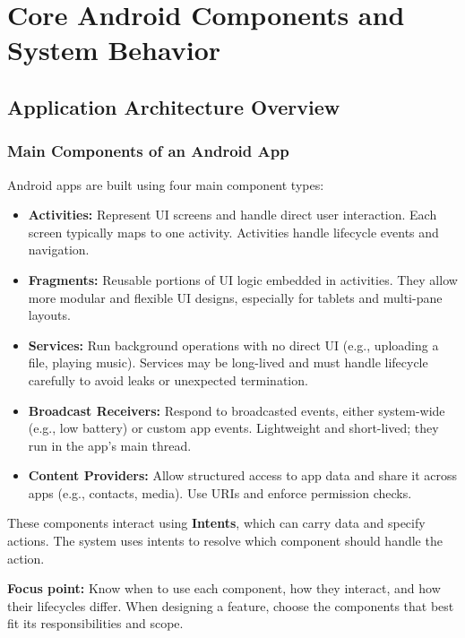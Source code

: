 \documentclass[a4paper,12pt]{article}
\begin{document}
\section{Core Android Components and System Behavior}

\subsection{Application Architecture Overview}

\subsubsection{Main Components of an Android App}

Android apps are built using four main component types:

\begin{itemize}
  \item \textbf{Activities:} Represent UI screens and handle direct user interaction. Each screen typically maps to one activity. Activities handle lifecycle events and navigation.
  
  \item \textbf{Fragments:} Reusable portions of UI logic embedded in activities. They allow more modular and flexible UI designs, especially for tablets and multi-pane layouts.
  
  \item \textbf{Services:} Run background operations with no direct UI (e.g., uploading a file, playing music). Services may be long-lived and must handle lifecycle carefully to avoid leaks or unexpected termination.
  
  \item \textbf{Broadcast Receivers:} Respond to broadcasted events, either system-wide (e.g., low battery) or custom app events. Lightweight and short-lived; they run in the app’s main thread.
  
  \item \textbf{Content Providers:} Allow structured access to app data and share it across apps (e.g., contacts, media). Use URIs and enforce permission checks.
\end{itemize}

These components interact using \textbf{Intents}, which can carry data and specify actions. The system uses intents to resolve which component should handle the action.

\textbf{Focus point:} Know when to use each component, how they interact, and how their lifecycles differ. When designing a feature, choose the components that best fit its responsibilities and scope.
\end{document}
